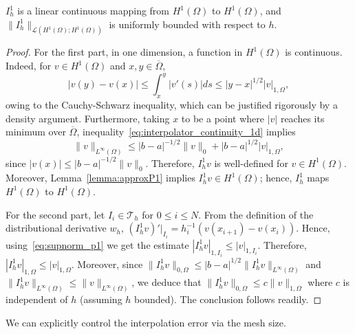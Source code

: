 \begin{lemma}\label{lemma:cont1D}
    $I_h^1$ is a linear continuous mapping from $H^1(\Omega)$ to $H^1(\Omega)$, and $\|I_h^1\|_{\mathcal{L}(H^1(\Omega);H^1(\Omega))}$ is uniformly bounded with respect to $h$.
    \begin{proof}
        For the first part, in one dimension, a function in $H^1(\Omega)$ is continuous. Indeed, for $v \in H^1(\Omega)$ and $x,y \in \overline{\Omega}$,
        \begin{equation}\label{eq:interpolator_continuity_1d}
            |v(y) - v(x)| \le \int_x^y |v'(s)| ds  \le |y-x|^{1/2} |v|_{1,\Omega},
        \end{equation}
        owing to the Cauchy-Schwarz inequality, which can be justified rigorously by a density argument. Furthermore, taking $x$ to be a point where $|v|$ reaches its minimum over $\overline{\Omega}$, inequality~\eqref{eq:interpolator_continuity_1d} implies
        \begin{equation*}\label{eq:supnorm_p1}
            \|v\|_{L^\infty(\Omega)} \le |b-a|^{-1/2} \|v\|_{0} + |b-a|^{1/2}|v|_{1,\Omega},
        \end{equation*}
        since $|v(x)| \le |b-a|^{-1/2} \|v\|_{0}$. Therefore, $I_h^1 v$ is well-defined for $v \in H^1(\Omega)$. Moreover, Lemma~\ref{lemma:approxP1} implies $I_h^1 v \in H^1(\Omega)$; hence, $I_h^1$ maps $H^1(\Omega)$ to $H^1(\Omega)$.

        For the second part, let $I_i \in \mathcal{T}_h$ for $0 \le i \le N$. From the definition of the distributional derivative $w_h$, $(I_h^1 v)'|_{I_i} = h_i^{-1}(v(x_{i+1}) - v(x_i))$. Hence, using~\eqref{eq:supnorm_p1} we get the estimate $|I_h^1 v|_{1,I_i} \le |v|_{1,I_i}$. Therefore, $|I_h^1 v|_{1,\Omega} \le |v|_{1,\Omega}$. Moreover, since $\|I_h^1 v\|_{0,\Omega} \le |b-a|^{1/2} \|I_h^1 v\|_{L^\infty(\Omega)}$ and $\|I_h^1 v\|_{L^\infty(\Omega)} \le \|v\|_{L^\infty(\Omega)}$, we deduce that $\|I_h^1 v\|_{0,\Omega} \le c \|v\|_{1,\Omega}$ where $c$ is independent of $h$ (assuming $h$ bounded). The conclusion follows readily.
    \end{proof}
\end{lemma}
We can explicitly control the interpolation error via the mesh size.
